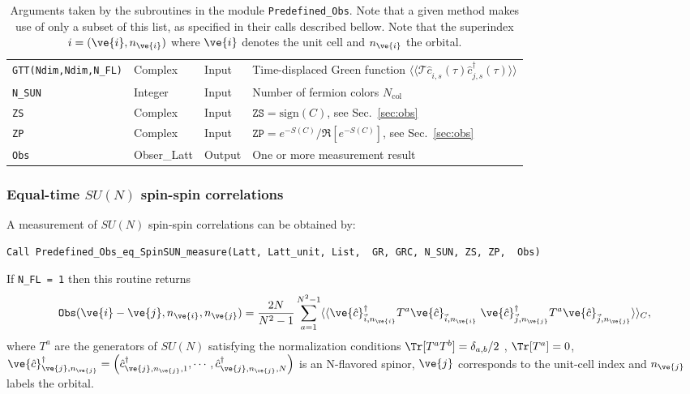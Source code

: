 \begin{table}[h]
\begin{center}
\begin{tabular}{@{} p{}  p{} p{} p{}  @{}}
			\texttt{GTT(Ndim,Ndim,N\_FL)} & Complex    & Input  & Time-displaced Green function $\langle \langle \mathcal{T} \hat{c}^{\phantom\dagger}_{i,s}(\tau) \hat{c}^{\dagger}_{j,s}(\tau) \rangle \rangle $\\
			\texttt{N\_SUN}               & Integer    & Input  & Number of fermion colors $N_{\mathrm{col}}$\\
			\texttt{ZS}                   & Complex    & Input  & $\texttt{ZS} = \text{sign}(C)$, see Sec.~\ref{sec:obs}\\
			\texttt{ZP}                   & Complex    & Input  & $\texttt{ZP} = e^{-S(C)}/\Re \left[e^{-S(C)} \right]$, see Sec.~\ref{sec:obs}\\
			\texttt{Obs}                  & Obser\_Latt& Output & One or more measurement result\\
			\bottomrule
		\end{tabular}
		\caption{Arguments taken by the subroutines in the module \texttt{Predefined\_Obs}. Note that a given method makes use of only a subset of this list, as specified in their calls described bellow.   Note that 
		the superindex $i = (\ve{i}, n_{\ve{i}})$  where $\ve{i}$ denotes the unit cell and $n_{\ve{i}}$ the orbital. }		\label{table:predefined_obs}
	\end{center}
\end{table}


\subsubsection{Equal-time $SU(N)$ spin-spin correlations}

A measurement of $SU(N)$ spin-spin correlations can be obtained by:
\begin{lstlisting}[style=fortran]
Call Predefined_Obs_eq_SpinSUN_measure(Latt, Latt_unit, List,  GR, GRC, N_SUN, ZS, ZP,  Obs)
\end{lstlisting}

If \texttt{N\_FL = 1} then  this routine returns
\begin{align}
\texttt{Obs}(\ve{i}-\ve{j},n_{\ve{i}}, n_{\ve{j}})  = \frac{2N}{N^2-1}\sum_{a=1}^{N^2 - 1}  \langle \langle \ve{\hat{c}}^{\dagger}_{\vec{i}, n_{\ve{i}}} T^a \ve{\hat{c}}^{\phantom\dagger}_{\vec{i},n_{\ve{i}}}   \;   \ve{\hat{c}}^{\dagger}_{\vec{j},n_{\ve{j}}} T^a  \ve{\hat{c}}^{\phantom\dagger}_{\vec{j},n_{\ve{j}}}\rangle\rangle_C,
\end{align}
where $T^a$ are the generators of $SU(N)$ satisfying the normalization conditions  $\Tr [ T^a  T^b ]= \delta_{a,b}/2$ , $\Tr [ T^a ] = 0 $,    
$ \ve{\hat{c}}^{\dagger}_{\ve{j},n_{\ve{j}}}   =  \left(   \hat{c}^{\dagger}_{\ve{j}, n_{\ve{j}},1},   \cdots, \hat{c}^{\dagger}_{\ve{j},n_{\ve{j}},N}  \right)    $     is an N-flavored spinor,  
$\ve{j}$   corresponds to the unit-cell index and $n_{\ve{j}}$    labels the orbital.

